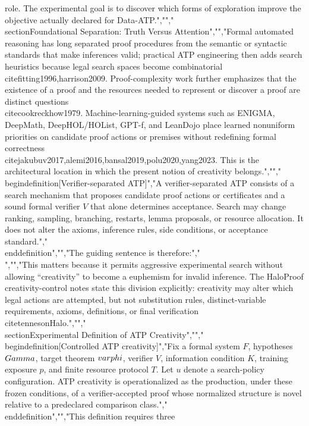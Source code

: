 {{{role. The experimental goal is to discover which forms of exploration improve the objective actually declared for Data-ATP.","","\\section{Foundational Separation: Truth Versus Attention}","","Formal automated reasoning has long separated proof procedures from the semantic or syntactic standards that make inferences valid; practical ATP engineering then adds search heuristics because legal search spaces become combinatorial \\cite{fitting1996,harrison2009}. Proof-complexity work further emphasizes that the existence of a proof and the resources needed to represent or discover a proof are distinct questions \\cite{cookreckhow1979}. Machine-learning-guided systems such as ENIGMA, DeepMath, DeepHOL/HOList, GPT-f, and LeanDojo place learned nonuniform priorities on candidate proof actions or premises without redefining formal correctness \\cite{jakubuv2017,alemi2016,bansal2019,polu2020,yang2023}. This is the architectural location in which the present notion of creativity belongs.","","\\begin{definition}[Verifier-separated ATP]","A verifier-separated ATP consists of a search mechanism that proposes candidate proof actions or certificates and a sound formal verifier $V$ that alone determines acceptance. Search may change ranking, sampling, branching, restarts, lemma proposals, or resource allocation. It does not alter the axioms, inference rules, side conditions, or acceptance standard.","\\end{definition}","","The guiding sentence is therefore:","\\[","\\boxed{\\text{Verification determines correctness; search determines attention.}}","\\]","","This matters because it permits aggressive experimental search without allowing ``creativity'' to become a euphemism for invalid inference. The HaloProof creativity-control notes state this division explicitly: creativity may alter which legal actions are attempted, but not substitution rules, distinct-variable requirements, axioms, definitions, or final verification \\cite{tennesonHalo}.","","\\section{Experimental Definition of ATP Creativity}","","\\begin{definition}[Controlled ATP creativity]","Fix a formal system $F$, hypotheses $\\Gamma$, target theorem $\\varphi$, verifier $V$, information condition $K$, training exposure $p$, and finite resource protocol $T$. Let $u$ denote a search-policy configuration. ATP creativity is operationalized as the production, under these frozen conditions, of a verifier-accepted proof whose normalized structure is novel relative to a predeclared comparison class.","\\end{definition}","","This definition requires three }}}
